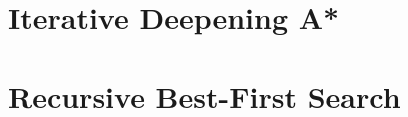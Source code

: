 



\section{Iterative Deepening A*}





\section{Recursive Best-First Search}
\label{sec:code_rbfs}



